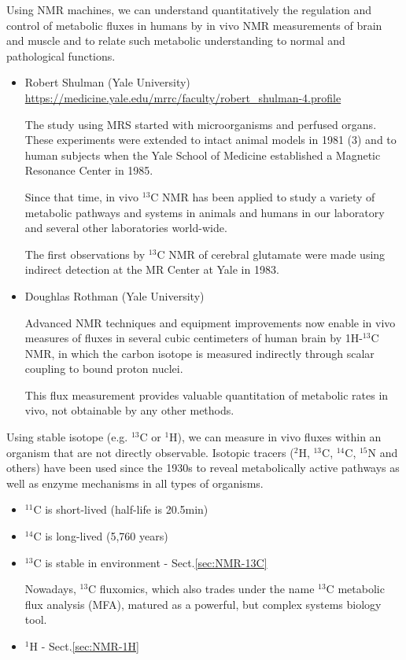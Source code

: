Using NMR machines, we can understand quantitatively the regulation and control
of metabolic fluxes in humans by in vivo NMR measurements of brain and muscle
and to relate such metabolic understanding to normal and pathological functions.
\begin{itemize}
  \item Robert Shulman (Yale University) \url{https://medicine.yale.edu/mrrc/faculty/robert_shulman-4.profile}
  
The study using MRS started with microorganisms and perfused organs. These
experiments were extended to intact animal models in 1981 (3) and to human
subjects when the Yale School of Medicine established a Magnetic Resonance
Center in 1985. 

Since that time, in vivo $^{13}$C NMR has been applied to study a variety of
metabolic pathways and systems in animals and humans in our laboratory and
several other laboratories world-wide.

The first observations by $^{13}$C NMR of cerebral glutamate were made using
indirect detection at the MR Center at Yale in 1983.


  \item Doughlas Rothman (Yale University)
  
Advanced NMR techniques and equipment improvements now enable in vivo measures
of fluxes in several cubic centimeters of human brain by 1H-$^{13}$C NMR, in
which the carbon isotope is measured indirectly through scalar coupling to bound
proton nuclei.

This flux measurement provides valuable quantitation of metabolic rates in vivo,
not obtainable by any other methods.
  
\end{itemize}


Using stable isotope (e.g. $^{13}$C or $^{1}$H), we can measure  in vivo fluxes within an
organism that are not directly observable.
Isotopic tracers ($^2$H, $^{13}$C, $^{14}$C, $^{15}$N and others) have been used
since the 1930s to reveal metabolically active pathways as well as enzyme
mechanisms in all types of organisms.
\begin{itemize}
  
  \item $^{11}$C is short-lived (half-life is 20.5min)
  
  \item $^{14}$C is long-lived (5,760 years)
  
  \item $^{13}$C is stable in  environment - Sect.\ref{sec:NMR-13C}
  
  Nowadays, $^{13}$C fluxomics, which also trades under the name $^{13}$C
metabolic flux analysis (MFA), matured as a powerful, but complex systems
biology tool.

  \item $^{1}$H - Sect.\ref{sec:NMR-1H}
  
\end{itemize}

